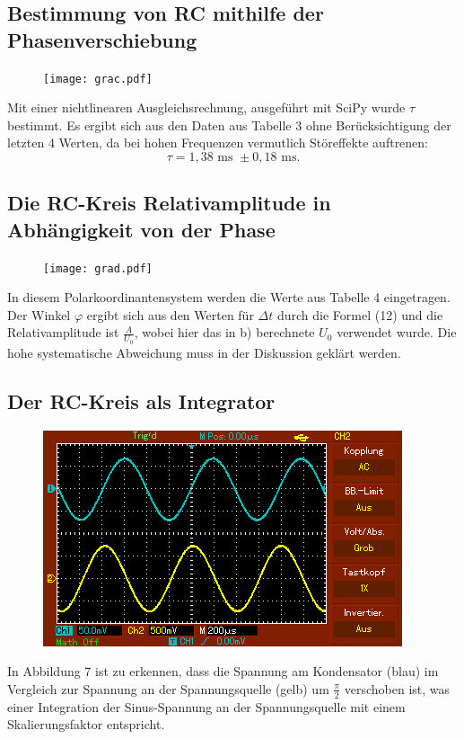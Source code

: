 \subsection{Bestimmung von RC mithilfe der Phasenverschiebung}
	 \begin{figure}[H]
	 	\centering
	 	\caption{}
	 	\texttt{[image: grac.pdf]}
	 	\label{fig:grac}
	 \end{figure}
	 
	 Mit einer nichtlinearen Ausgleichsrechnung, ausgeführt mit SciPy \cite{scipy} wurde $\tau$ bestimmt. Es ergibt sich aus den Daten aus Tabelle 3 ohne Berücksichtigung der letzten 4 Werten, da bei hohen Frequenzen vermutlich Störeffekte auftrenen:
	 \begin{displaymath}
	 \tau = 1,38  \text{ ms } \pm 0,18 \text{ ms.}
	 \end{displaymath}
	 

	 \subsection{Die RC-Kreis Relativamplitude in Abhängigkeit von der Phase}

	 \begin{figure}[H]
	  \centering
	  \caption{}
	  \texttt{[image: grad.pdf]}
	  \label{fig:grad}
	 \end{figure}
	 
	 In diesem Polarkoordinantensystem werden die Werte aus Tabelle 4 eingetragen. Der Winkel $\varphi$ ergibt sich aus den Werten für $\Delta t$ durch die Formel (12) und die Relativamplitude ist $\frac{A}{U_{0}}$, wobei hier das in b) berechnete $U_{0}$ verwendet wurde. Die hohe systematische Abweichung muss in der Diskussion geklärt werden.
	 
	 
	 
	 \subsection{Der RC-Kreis als Integrator}
	 \begin{figure}[H]
	 	\centering
	 	\caption{}
	 	\includegraphics[width=\linewidth-70pt,height=\textheight-70pt,keepaspectratio]{content/MAP002.png}
	 	\label{fig:Sinus}
	 \end{figure}
	 In Abbildung 7 ist zu erkennen, dass die Spannung am Kondensator (blau) im Vergleich zur Spannung an der Spannungsquelle (gelb) um $\frac{\pi}{2}$ verschoben ist, was einer Integration der Sinus-Spannung an der Spannungsquelle mit einem Skalierungsfaktor entspricht. 
	 
